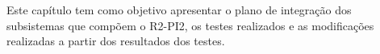 Este capítulo tem como objetivo apresentar o plano de integração dos subsistemas que compõem o R2-PI2, os testes realizados e as modificações realizadas a partir dos resultados dos testes.

